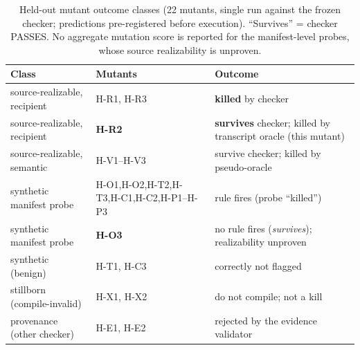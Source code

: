 \documentclass[conference]{IEEEtran}
\begin{document}
\begin{table}[t]
\centering\footnotesize\renewcommand{\arraystretch}{1.2}
\caption{Held-out mutant outcome classes (22 mutants, single run against the frozen checker;
predictions pre-registered before execution). ``Survives'' = checker PASSES. No aggregate
mutation score is reported for the manifest-level probes, whose source realizability is
unproven.}
\label{tab:heldout}
\begin{tabularx}{\textwidth}{@{}l l X@{}}
\toprule
\textbf{Class} & \textbf{Mutants} & \textbf{Outcome} \\
\midrule
source-realizable, recipient & H-R1, H-R3 & \textbf{killed} by checker \\
source-realizable, recipient & \textbf{H-R2} & \textbf{survives} checker; killed by transcript oracle (this mutant) \\
source-realizable, semantic & H-V1--H-V3 & survive checker; killed by pseudo-oracle \\
synthetic manifest probe & H-O1,H-O2,H-T2,H-T3,H-C1,H-C2,H-P1--H-P3 & rule fires (probe ``killed'') \\
synthetic manifest probe & \textbf{H-O3} & no rule fires (\emph{survives}); realizability unproven \\
synthetic (benign) & H-T1, H-C3 & correctly not flagged \\
stillborn (compile-invalid) & H-X1, H-X2 & do not compile; not a kill \\
provenance (other checker) & H-E1, H-E2 & rejected by the evidence validator \\
\bottomrule
\end{tabularx}
\end{table}

\end{document}
